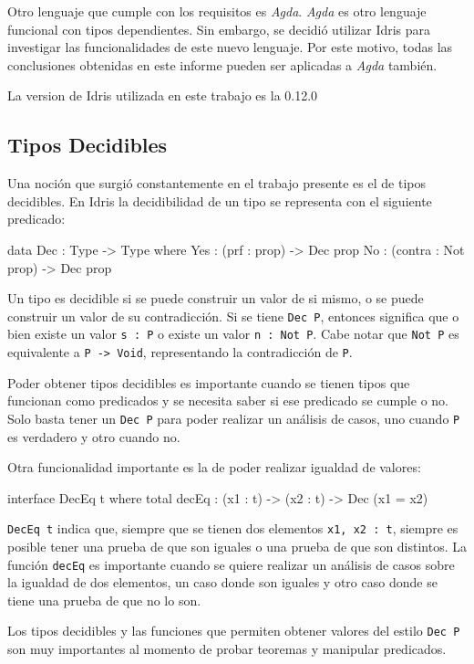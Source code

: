Otro lenguaje que cumple con los requisitos es \textit{Agda}. \textit{Agda} es otro lenguaje funcional con tipos dependientes. Sin embargo, se decidió utilizar Idris para investigar las funcionalidades de este nuevo lenguaje.
Por este motivo, todas las conclusiones obtenidas en este informe pueden ser aplicadas a \textit{Agda} también.

La version de Idris utilizada en este trabajo es la 0.12.0

\subsection{Tipos Decidibles}

Una noción que surgió constantemente en el trabajo presente es el de tipos decidibles. En Idris la decidibilidad de un tipo se representa con el siguiente predicado:

\begin{code}
data Dec : Type -> Type where
  Yes : (prf : prop) -> Dec prop
  No  : (contra : Not prop) -> Dec prop
\end{code}

Un tipo es decidible si se puede construir un valor de si mismo, o se puede construir un valor de su contradicción. Si se tiene \texttt{Dec P}, entonces significa que o bien existe un valor \texttt{s : P} o existe un valor \texttt{n : Not P}. Cabe notar que \texttt{Not P} es equivalente a \texttt{P -> Void}, representando la contradicción de \texttt{P}.

Poder obtener tipos decidibles es importante cuando se tienen tipos que funcionan como predicados y se necesita saber si ese predicado se cumple o no. Solo basta tener un \texttt{Dec P} para poder realizar un análisis de casos, uno cuando \texttt{P} es verdadero y otro cuando no.

Otra funcionalidad importante es la de poder realizar igualdad de valores:

\begin{code}
interface DecEq t where
  total decEq : (x1 : t) -> (x2 : t) -> Dec (x1 = x2)
\end{code}

\texttt{DecEq t} indica que, siempre que se tienen dos elementos \texttt{x1, x2 : t}, siempre es posible tener una prueba de que son iguales o una prueba de que son distintos. La función \texttt{decEq} es importante cuando se quiere realizar un análisis de casos sobre la igualdad de dos elementos, un caso donde son iguales y otro caso donde se tiene una prueba de que no lo son.

Los tipos decidibles y las funciones que permiten obtener valores del estilo \texttt{Dec P} son muy importantes al momento de probar teoremas y manipular predicados.
